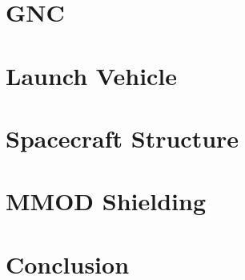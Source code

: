 \documentclass[onecolumn,10pt]{jhwhw}
\begin{document}
\chapter{GNC}
\chapter{Launch Vehicle}
\chapter{Spacecraft Structure}
\chapter{MMOD Shielding}
\chapter{Conclusion}


{}
\end{document}
